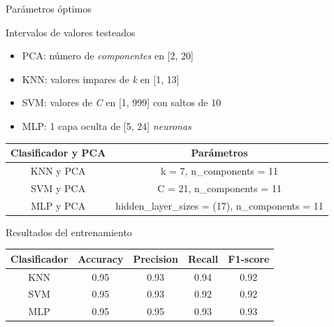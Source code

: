 \documentclass{beamer}
\begin{document}
\begin{frame}{Parámetros óptimos}
\begin{block}{Intervalos de valores testeados}
\begin{itemize}
    \item PCA: número de \textit{componentes} en [2, 20]
    \item KNN: valores impares de \textit{k} en [1, 13]
    \item SVM: valores de \textit{C} en [1, 999] con saltos de 10
    \item MLP: 1 capa oculta de [5, 24] \textit{neuronas}
\end{itemize}
\end{block}

\begin{table}[H]
\begin{center}
\begin{tabular}{|c|c|}
    \hline
    \textbf{Clasificador y PCA} & \textbf{Parámetros} \\
    \hline
     KNN y PCA & k = 7, n\_components = 11\\
     SVM y PCA & C = 21, n\_components = 11\\
     MLP y PCA & hidden\_layer\_sizes = (17), n\_components = 11\\
     \hline
 \end{tabular}
\end{center}
\end{table}
\end{frame}

\begin{frame}{Resultados del entrenamiento}
\label{diapo:resultados_entrenamiento}
\begin{table}[H]
\begin{center}
\begin{tabular}{|c|c|c|c|c|}
     \hline
    \textbf{Clasificador} & \textbf{Accuracy} & \textbf{Precision} & \textbf{Recall} & \textbf{F1-score}\\
    \hline
     KNN & 0.95 & 0.93 & 0.94 & 0.92\\
     SVM & 0.95 & 0.93 & 0.92 & 0.92\\
     MLP & 0.95 & 0.95 & 0.93 & 0.93\\
     \hline
\end{tabular}
\end{center}
\end{table}
\end{frame}
\end{document}
